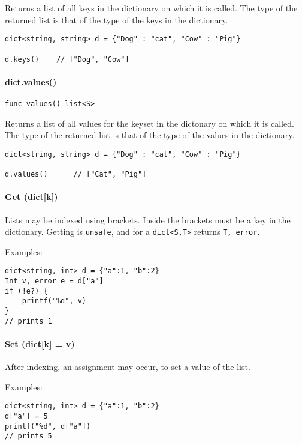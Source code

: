 Returns a list of all keys in the dictionary on which it is called. The
type of the returned list is that of the type of the keys in the
dictionary.

\begin{verbatim}
dict<string, string> d = {"Dog" : "cat", "Cow" : "Pig"}

d.keys()    // ["Dog", "Cow"]
\end{verbatim}

\paragraph{dict.values()}\label{dict.values}

\begin{verbatim}
func values() list<S>
\end{verbatim}

Returns a list of all values for the keyset in the dictonary on which it
is called. The type of the returned list is that of the type of the
values in the dictionary.

\begin{verbatim}
dict<string, string> d = {"Dog" : "cat", "Cow" : "Pig"}

d.values()      // ["Cat", "Pig"]
\end{verbatim}

\paragraph{Get (dict{[}k{]})}\label{get-dictk}

Lists may be indexed using brackets. Inside the brackets must be a key
in the dictionary. Getting is \texttt{unsafe}, and for a
\texttt{dict\textless{}S,T\textgreater{}} returns \texttt{T, error}.

Examples:

\begin{verbatim}
dict<string, int> d = {"a":1, "b":2}
Int v, error e = d["a"]
if (!e?) {
    printf("%d", v)
}
// prints 1
\end{verbatim}

\paragraph{Set (dict{[}k{]} = v)}\label{set-dictk-v}

After indexing, an assignment may occur, to set a value of the list.

Examples:

\begin{verbatim}
dict<string, int> d = {"a":1, "b":2}
d["a"] = 5
printf("%d", d["a"])
// prints 5
\end{verbatim}

